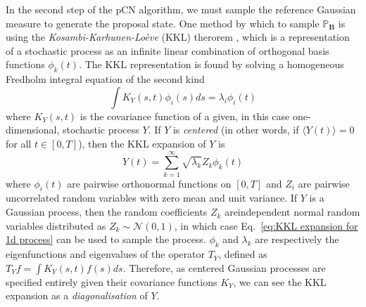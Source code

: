 In the second step of the pCN algorithm, we must sample the reference Gaussian measure to generate the proposal state. One method by which to sample $\mathbb{P}_\mathbf{B}$ is using the \textit{Kosambi-Karhunen-Lo\`eve} (KKL) therorem \citep{kosambiParallelismPathspaces, karhunenUeberLineareMethoden1947, loeveProbabilityTheory1977}, which is a representation of a stochastic process as an infinite linear combination of orthogonal basis functions $\phi_k(t)$. The KKL representation is found by solving a homogeneous Fredholm integral equation of the second kind
\begin{equation} \label{eq:fredholm eq for KKL}
	\int K_Y(s, t) \phi_i(s) ds = \lambda_i \phi_i(t)
\end{equation}
where $K_Y(s,t)$ is the covariance function of a given, in this case one-dimensional, stochastic process $Y$. If $Y$ is \textit{centered} (in other words, if $\langle Y(t) \rangle = 0$ for all $t \in [0, T]$), then the KKL expansion of $Y$ is
\begin{equation} \label{eq:KKL expansion for 1d process}
	Y(t) = \sum_{k=1}^\infty \sqrt{\lambda_k} Z_k \phi_k(t)
\end{equation}
where $\phi_i(t)$ are pairwise orthonormal functions on $[0, T]$ and $Z_i$ are pairwise uncorrelated random variables with zero mean and unit variance. If $Y$ is a Gaussian process, then the random coefficients $Z_k$ areindependent normal random variables distributed as $Z_k \sim \mathcal{N}(0, 1)$, in which case Eq.~\ref{eq:KKL expansion for 1d process} can be used to sample the process. $\phi_k$ and $\lambda_k$ are respectively the eigenfunctions and eigenvalues of the operator $T_Y$, defined as $T_Y f = \int K_Y(s, t) f(s) ds$. Therefore, as centered Gaussian processes are specified entirely given their covariance functions $K_Y$, we can see the KKL expansion as a \textit{diagonalisation} of $Y$.

